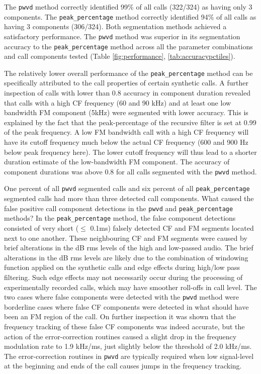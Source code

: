 \documentclass[
]{book}
\begin{document}
The \texttt{pwvd} method correctly identified 99\% of all calls (322/324) as having only 3 components. The \texttt{peak\_percentage} method correctly identified 94\% of all calls as having 3 components (306/324). Both segmentation methods achieved a satisfactory performance. The \texttt{pwvd} method was superior in its segmentation accuracy to the \texttt{peak\_percentage} method across all the parameter combinations and call components tested (Table \ref{fig:performance}, \ref{tab:accuracypctiles}).

The relatively lower overall performance of the \texttt{peak\_percentage} method can be specifically attributed to the call properties of certain synthetic calls. A further inspection of calls with lower than 0.8 accuracy in component duration revealed that calls with a high CF frequency (60 and 90 kHz) and at least one low bandwidth FM component (5kHz) were segmented with lower accuracy. This is explained by the fact that the peak-percentage of the recursive filter is set at 0.99 of the peak frequency. A low FM bandwidth call with a high CF frequency will have its cutoff frequency much below the actual CF frequency (600 and 900 Hz below peak frequency here). The lower cutoff frequency will thus lead to a shorter duration estimate of the low-bandwidth FM component. The accuracy of component durations was above 0.8 for all calls segmented with the \texttt{pwvd} method.

One percent of all \texttt{pwvd} segmented calls and six percent of all \texttt{peak\_percentage} segmented calls had more than three detected call components. What caused the false positive call component detections in the \texttt{pwvd} and \texttt{peak\_percentage} methods? In the \texttt{peak\_percentage} method, the false component detections consisted of very short (\(\leq\) 0.1ms) falsely detected CF and FM segments located next to one another. These neighbouring CF and FM segments were caused by brief alterations in the dB rms levels of the high and low-passed audio. The brief alterations in the dB rms levels are likely due to the combination of windowing function applied on the synthetic calls and edge effects during high/low pass filtering. Such edge effects may not necessarily occur during the processing of experimentally recorded calls, which may have smoother roll-offs in call level. The two cases where false components were detected with the \texttt{pwvd} method were borderline cases where false CF components were detected in what should have been an FM region of the call. On further inspection it was shown that the frequency tracking of these false CF components was indeed accurate, but the action of the error-correction routines caused a slight drop in the frequency modulation rate to 1.9 kHz/ms, just slightly below the threshold of 2.0 kHz/ms. The error-correction routines in \texttt{pwvd} are typically required when low signal-level at the beginning and ends of the call causes jumps in the frequency tracking.
\end{document}
